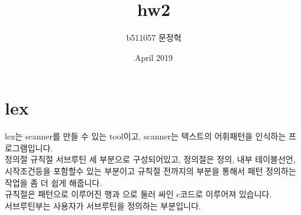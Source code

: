 \documentclass{article}
\title{hw2}
\author{b511057 문정혁 }
\date{April 2019}
\begin{document}
\maketitle

\section{lex}
\qquad lex는 scanner를 만들 수 있는 tool이고, scanner는 텍스트의 어휘패턴을 인식하는 프로그램입니다. \\
정의절 규칙절 서브루틴 세 부분으로 구성되어있고, 정의절은 정의, 내부 테이블선언, 시작조건등을 포함할수 있는 부분이고 규칙절 전까지의 부분을 통해서 패턴 정의하는 작업을 좀 더 쉽게 해줍니다. \\ 
\indent 규칙절은 패턴으로 이루어진 행과 {}으로 둘러 싸인 c코드로 이루어져 있습니다. \\
서브루틴부는 사용자가 서브루틴을 정의하는 부분입니다.\\ \\
\end{document}
